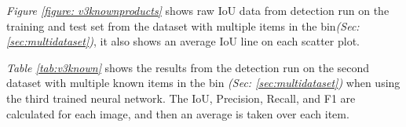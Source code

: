 \textit{Figure \ref{figure: v3knownproducts}} shows raw IoU data from detection run on the training and test set from the dataset with multiple items in the bin\textit{(Sec: \ref{sec:multidataset})}, it also shows an average IoU line on each scatter plot.


\begin{table}[h]
\caption{Detection results when tested on trained data using the third neural network}
\label{tab:v3known}
\end{table}
\textit{Table \ref{tab:v3known}} shows the results from the detection run on the second dataset with multiple known items in the bin \textit{(Sec: \ref{sec:multidataset})} when using the third trained neural network. The IoU, Precision, Recall, and F1 are calculated for each image, and then an average is taken over each item. 

